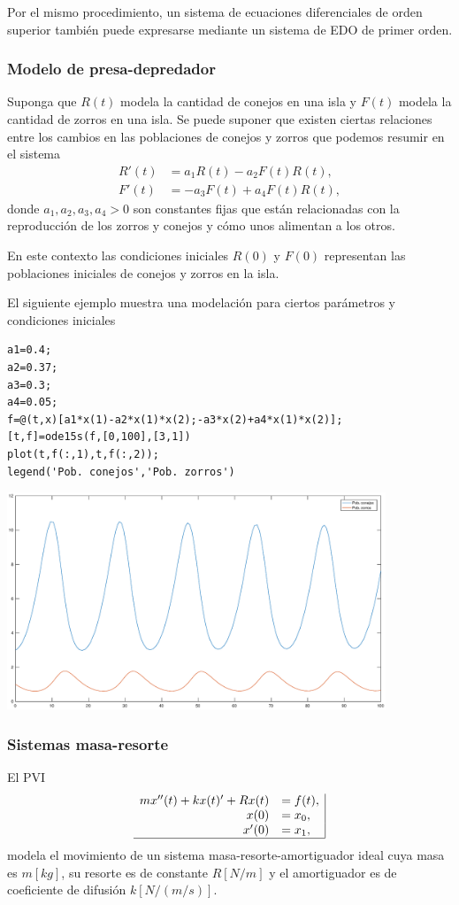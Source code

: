 \documentclass[letter,11pt]{article}
\begin{document}
Por el mismo procedimiento, un sistema de ecuaciones diferenciales de orden superior tambi\'en puede expresarse mediante un sistema de EDO de primer orden.
\medskip


\subsubsection{Modelo de presa-depredador}
Suponga que $R(t)$ modela la cantidad de conejos en una isla y $F(t)$ modela la cantidad de zorros en una isla. Se puede suponer que existen ciertas relaciones entre los cambios en las poblaciones de conejos y zorros que podemos resumir en el sistema
$$
\begin{array}{cl}
R'(t) &= a_1 R(t)- a_2 F(t)R(t),\\
F'(t) &=-a_3 F(t)+ a_4 F(t)R(t),
\end{array}
$$
donde $a_1,a_2,a_3,a_4>0$ son constantes fijas que est\'an relacionadas con la reproducci\'on de los zorros y conejos y c\'omo unos alimentan a los otros.

En este contexto las condiciones iniciales $R(0)$ y $F(0)$ representan las poblaciones iniciales de conejos y zorros en la isla.

El siguiente ejemplo muestra una modelaci\'on para ciertos par\'ametros y condiciones iniciales
\begin{lstlisting}
a1=0.4;
a2=0.37;
a3=0.3;
a4=0.05;
f=@(t,x)[a1*x(1)-a2*x(1)*x(2);-a3*x(2)+a4*x(1)*x(2)];
[t,f]=ode15s(f,[0,100],[3,1])
plot(t,f(:,1),t,f(:,2));
legend('Pob. conejos','Pob. zorros')
\end{lstlisting}
\begin{center}
\includegraphics[width=0.85\textwidth]{eje4.eps}
\end{center}

\subsubsection{Sistemas masa-resorte}
El PVI 
$$
\begin{array}{rl|}
mx''(t)+kx(t)'+Rx(t) & = f(t),\\
x(0) & =x_0,\\
x'(0) & =x_1,\\\hline
\end{array}
$$
modela el movimiento de un sistema masa-resorte-amortiguador ideal cuya masa es $m[kg]$, su resorte es de constante $R[N/m]$ y el amortiguador es de coeficiente de difusi\'on $k[N/(m/s)]$.
\end{document}
